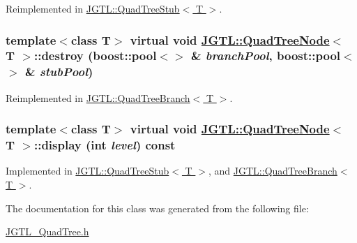 Reimplemented in \hyperlink{class_j_g_t_l_1_1_quad_tree_stub_69d364f4525bbc32d27ad2a7a2a4502b}{JGTL::Quad\-Tree\-Stub$<$ T $>$}.\hypertarget{class_j_g_t_l_1_1_quad_tree_node_c73b9973bed0498532647bd3ebfdaddb}{
\subsubsection[destroy]{\setlength{\rightskip}{0pt plus 5cm}template$<$class T$>$ virtual void \hyperlink{class_j_g_t_l_1_1_quad_tree_node}{JGTL::Quad\-Tree\-Node}$<$ T $>$::destroy (boost::pool$<$$>$ \& {\em branch\-Pool}, boost::pool$<$$>$ \& {\em stub\-Pool})}}
\label{class_j_g_t_l_1_1_quad_tree_node_c73b9973bed0498532647bd3ebfdaddb}




Reimplemented in \hyperlink{class_j_g_t_l_1_1_quad_tree_branch_ee97ca947b60a3cd9374f8decd1392d8}{JGTL::Quad\-Tree\-Branch$<$ T $>$}.\hypertarget{class_j_g_t_l_1_1_quad_tree_node_5d3e714f007be6a1ab507bcda173aede}{
\subsubsection[display]{\setlength{\rightskip}{0pt plus 5cm}template$<$class T$>$ virtual void \hyperlink{class_j_g_t_l_1_1_quad_tree_node}{JGTL::Quad\-Tree\-Node}$<$ T $>$::display (int {\em level}) const}}
\label{class_j_g_t_l_1_1_quad_tree_node_5d3e714f007be6a1ab507bcda173aede}




Implemented in \hyperlink{class_j_g_t_l_1_1_quad_tree_stub_d9cc4e6b8fb18dd55043edf3f503c9c7}{JGTL::Quad\-Tree\-Stub$<$ T $>$}, and \hyperlink{class_j_g_t_l_1_1_quad_tree_branch_1a9cb0c814af012ad2a1a891b7223179}{JGTL::Quad\-Tree\-Branch$<$ T $>$}.

The documentation for this class was generated from the following file:\begin{CompactItemize}
\item 
\hyperlink{_j_g_t_l___quad_tree_8h}{JGTL\_\-Quad\-Tree.h}\end{CompactItemize}
